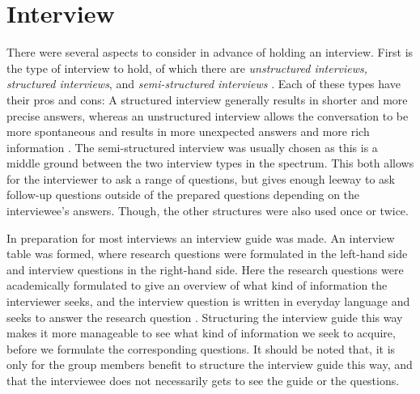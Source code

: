 \chapter{Interview} \label{sec:interview}

There were several aspects to consider in advance of holding an interview.
First is the type of interview to hold, of which there are \textit{unstructured interviews, structured interviews}, and \textit{semi-structured interviews} \citep{interactionhci}.
Each of these types have their pros and cons: A structured interview generally results in shorter and more precise answers, whereas an unstructured interview allows the conversation to be more spontaneous and results in more unexpected answers and more rich information \citep{interview}.
The semi-structured interview was usually chosen as this is a middle ground between the two interview types in the spectrum.
This both allows for the interviewer to ask a range of questions, but gives enough leeway to ask follow-up questions outside of the prepared questions depending on the interviewee’s answers.
Though, the other structures were also used once or twice.

In preparation for most interviews an interview guide was made.
An interview table was formed, where research questions were formulated in the left-hand side and interview questions in the right-hand side.
Here the research questions were academically formulated to give an overview of what kind of information the interviewer seeks, and the interview question is written in everyday language and seeks to answer the research question \citep{interview}.
Structuring the interview guide this way makes it more manageable to see what kind of information we seek to acquire, before we formulate the corresponding questions.
It should be noted that, it is only for the group members benefit to structure the interview guide this way, and that the interviewee does not necessarily gets to see the guide or the questions.
